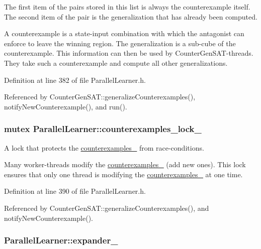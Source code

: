 The first item of the pairs stored in this list is always the counterexample itself. The second item of the pair is the generalization that has already been computed.

A counterexample is a state-\/input combination with which the antagonist can enforce to leave the winning region. The generalization is a sub-\/cube of the counterexample. This information can then be used by Counter\-Gen\-S\-A\-T-\/threads. They take such a counterexample and compute all other generalizations. 

Definition at line 382 of file Parallel\-Learner.\-h.



Referenced by Counter\-Gen\-S\-A\-T\-::generalize\-Counterexamples(), notify\-New\-Counterexample(), and run().

\hypertarget{classParallelLearner_a454c81908f2d3cb4c24b042739adc4ec}{
\subsubsection[{counterexamples\-\_\-lock\-\_\-}]{\setlength{\rightskip}{0pt plus 5cm}mutex Parallel\-Learner\-::counterexamples\-\_\-lock\-\_\-}}\label{classParallelLearner_a454c81908f2d3cb4c24b042739adc4ec}


A lock that protects the \hyperlink{classParallelLearner_a974943e3e2145b3407f689b64acdd33f}{counterexamples\-\_\-} from race-\/conditions. 

Many worker-\/threads modify the \hyperlink{classParallelLearner_a974943e3e2145b3407f689b64acdd33f}{counterexamples\-\_\-} (add new ones). This lock ensures that only one thread is modifying the \hyperlink{classParallelLearner_a974943e3e2145b3407f689b64acdd33f}{counterexamples\-\_\-} at one time. 

Definition at line 390 of file Parallel\-Learner.\-h.



Referenced by Counter\-Gen\-S\-A\-T\-::generalize\-Counterexamples(), and notify\-New\-Counterexample().

\hypertarget{classParallelLearner_a35a8e2d1a8263ae7ad71fdae77ff972d}{
\subsubsection[{expander\-\_\-}]{ Parallel\-Learner\-::expander\-\_\-\hspace{0.3cm}{\ttfamily [protected]}}}\label{classParallelLearner_a35a8e2d1a8263ae7ad71fdae77ff972d}


